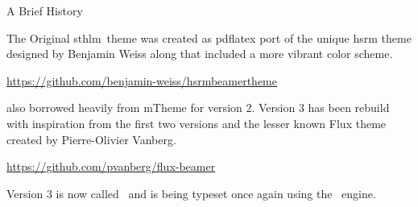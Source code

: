 \documentclass[\string~/GitHub/sthlmNordBeamerTheme/sthlmNordLightDemo.tex]{subfiles}
\begin{document}
\begin{frame}[c]{A Brief History}

	The Original \alert{sthlm}\ theme was created as pdflatex port of the unique
	\alert{hsrm} theme designed by Benjamin Weiss along that included a more vibrant
	color scheme.
	\begin{center}
		\url{https://github.com/benjamin-weiss/hsrmbeamertheme}
	\end{center}

	 also borrowed heavily from \alert{mTheme} for version 2.
	Version 3 has been rebuild with inspiration from the first two versions
	and the lesser known \alert{Flux} theme created by Pierre-Olivier Vanberg.
	\begin{center}
		\url{https://github.com/pvanberg/flux-beamer}
	\end{center}

	Version 3 is now called \snord\ and is being
	typeset once again using the \XeLaTeX \ engine.
\end{frame}
\end{document}
